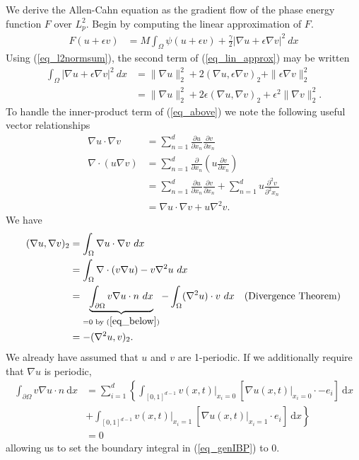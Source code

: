 \documentclass[12pt, reqno]{report}
\theoremstyle{definition}
\theoremstyle{remark}
\newcommand{\ud}{\mathrm{d}}
\begin{document}
We derive the Allen-Cahn equation as the gradient flow of the phase energy function $F$ over $L^2_p$.
Begin by computing the linear approximation of $F$.
\begin{align} \label{eq_lin_approx}
    F(u+\epsilon v)&= M\int_{\Omega}\psi(u+\epsilon v)+ \frac{\gamma}{2}|\nabla u+\epsilon\nabla v|^{2}\ dx
\end{align}
Using (\ref{eq_l2normsum}), the second term of (\ref{eq_lin_approx}) may be written 
\begin{align}
        \int_{\Omega}|\nabla u+\epsilon\nabla v|^{2}\ dx&=\|\nabla u\|_{2}^{2}+2( \nabla u,\epsilon\nabla v)_{2}+\|\epsilon \nabla v\|_{2}^{2}\\
        &=\|\nabla u\|_{2}^{2}+2\epsilon(\nabla u,\nabla v)_{2}+\epsilon^{2}\|\nabla v\|_{2}^{2}.\label{eq_above}
\end{align}
To handle the inner-product term of (\ref{eq_above}) we note the following useful vector relationships 
\begin{align}
    \nabla u\cdot \nabla v&= \sum_{n=1}^{d}\frac{\partial u}{\partial x_{n}}\frac{\partial v}{\partial x_{n}}\\
    \nabla \cdot(u\nabla v)&= \sum_{n=1}^{d}\frac{\partial}{\partial x_{n}}\left(u \frac{\partial v}{\partial x_{n}}\right)\\
    &= \sum_{n=1}^{d} \frac{\partial u}{\partial x_{n}}\frac{\partial v}{\partial x_{n}}+\sum_{n=1}^{d}u\frac{\partial^{2} v}{\partial^{2} x_{n}}\\
    &= \nabla u\cdot \nabla v+u\nabla ^{2}v.
\end{align}
We have
\begin{equation} \label{eq_genIBP}
    \begin{split} 
    (\nabla u,\nabla v)_{2}&= \int_{\Omega}\nabla u\cdot \nabla v~dx\\
    &= \int_{\Omega}\nabla \cdot(v \nabla u)-v \nabla ^{2}u\ dx\\
    &= \underbrace{\int_{\partial \Omega}v\nabla u\cdot n~dx}_{=0\text{ by }(\ref{eq_below})}-\int_{\Omega}(\nabla ^{2}u)\cdot v~dx\quad(\text{Divergence Theorem})
    \\
    &= -(\nabla ^{2}u,v)_{2}.
    \end{split}
\end{equation}
We already have assumed that $u$ and $v$ are 1-periodic. If we additionally require that $\nabla u$ is periodic, 
\begin{equation} \label{eq_below}
    \begin{split}
        \int_{\partial\Omega}v\nabla u\cdot n~\ud x&=\sum_{i=1}^{d }\left\{\int_{[0,1]^{d-1}}v(x,t)\big|_{x_i=0}~\left[\nabla u(x,t)\big|_{x_i=0}\cdot -e_i\right]~\ud x\right.\\
        &+\left.
        \int_{[0,1]^{d-1}}v(x,t)\big|_{x_i=1}~\left[\nabla u(x,t)\big|_{x_i=1}\cdot e_i\right]~\ud x
        \right\}\\
    &=0
    \end{split}
\end{equation}
allowing us to set the boundary integral in (\ref{eq_genIBP}) to 0.
\end{document}

